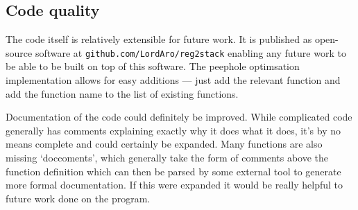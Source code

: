 \subsection{Code quality}
The code itself is relatively extensible for future work. It is published as
open-source software at \texttt{github.com/LordAro/reg2stack} enabling any
future work to be able to be built on top of this software. The peephole
optimsation implementation allows for easy additions --- just add the relevant
function and add the function name to the list of existing functions.

Documentation of the code could definitely be improved. While complicated code
generally has comments explaining exactly why it does what it does, it's by no
means complete and could certainly be expanded. Many functions are also missing
`doccoments', which generally take the form of comments above the function
definition which can then be parsed by some external tool to generate more
formal documentation. If this were expanded it would be really helpful to future
work done on the program.
